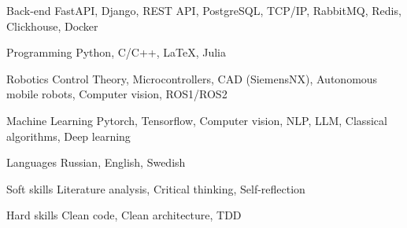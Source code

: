

\begin{cvskills}

  \cvskill
    {Back-end} %
    {FastAPI, Django, REST API, PostgreSQL, TCP/IP, RabbitMQ, Redis, Clickhouse, Docker} %

  \cvskill
    {Programming} %
    {Python, C/C++, LaTeX, Julia} %

  \cvskill
    {Robotics} %
    {Control Theory, Microcontrollers, CAD (SiemensNX), Autonomous mobile robots, Computer vision, ROS1/ROS2} %

  \cvskill
    {Machine Learning}
    {Pytorch, Tensorflow, Computer vision, NLP, LLM, Classical algorithms, Deep learning}

  \cvskill
    {Languages} %
    {Russian, English, Swedish} %

  \cvskill
    {Soft skills} %
    {Literature analysis, Critical thinking, Self-reflection} %

  \cvskill
    {Hard skills} %
    {Clean code, Clean architecture, TDD} %

\end{cvskills}

